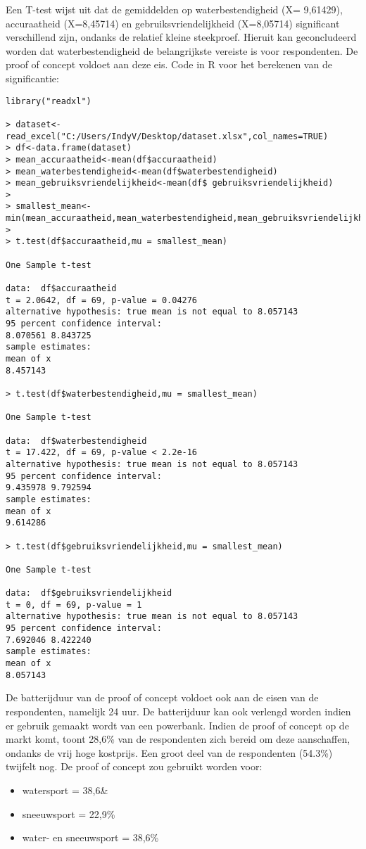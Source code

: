 Een T-test wijst uit dat de gemiddelden op waterbestendigheid (X= 9,61429), accuraatheid (X=8,45714) en gebruiksvriendelijkheid (X=8,05714) significant verschillend zijn, ondanks de relatief kleine steekproef. Hieruit kan geconcludeerd worden dat waterbestendigheid de belangrijkste vereiste is voor respondenten. De proof of concept voldoet aan deze eis.
\newline
\newline
Code in R voor het berekenen van de significantie:
\begin{verbatim}
library("readxl")

> dataset<-read_excel("C:/Users/IndyV/Desktop/dataset.xlsx",col_names=TRUE)
> df<-data.frame(dataset)
> mean_accuraatheid<-mean(df$accuraatheid)
> mean_waterbestendigheid<-mean(df$waterbestendigheid)
> mean_gebruiksvriendelijkheid<-mean(df$ gebruiksvriendelijkheid)
> 
> smallest_mean<-min(mean_accuraatheid,mean_waterbestendigheid,mean_gebruiksvriendelijkheid)
> 
> t.test(df$accuraatheid,mu = smallest_mean)

One Sample t-test

data:  df$accuraatheid
t = 2.0642, df = 69, p-value = 0.04276
alternative hypothesis: true mean is not equal to 8.057143
95 percent confidence interval:
8.070561 8.843725
sample estimates:
mean of x 
8.457143 

> t.test(df$waterbestendigheid,mu = smallest_mean)

One Sample t-test

data:  df$waterbestendigheid
t = 17.422, df = 69, p-value < 2.2e-16
alternative hypothesis: true mean is not equal to 8.057143
95 percent confidence interval:
9.435978 9.792594
sample estimates:
mean of x 
9.614286 

> t.test(df$gebruiksvriendelijkheid,mu = smallest_mean)

One Sample t-test

data:  df$gebruiksvriendelijkheid
t = 0, df = 69, p-value = 1
alternative hypothesis: true mean is not equal to 8.057143
95 percent confidence interval:
7.692046 8.422240
sample estimates:
mean of x 
8.057143 
\end{verbatim}
De batterijduur van de proof of concept voldoet ook aan de eisen van de respondenten, namelijk 24 uur. De batterijduur kan ook verlengd worden indien er gebruik gemaakt wordt van een powerbank.
\newline
Indien de proof of concept op de markt komt, toont 28,6\% van de respondenten zich bereid om deze aanschaffen, ondanks de vrij hoge kostprijs. Een groot deel van de respondenten (54.3\%) twijfelt nog. 
\newline
De proof of concept zou gebruikt worden voor:
\begin{itemize}
	\item watersport = 38,6\&
	\item sneeuwsport = 22,9\%
	\item water- en sneeuwsport = 38,6\%
\end{itemize}
\pagebreak
